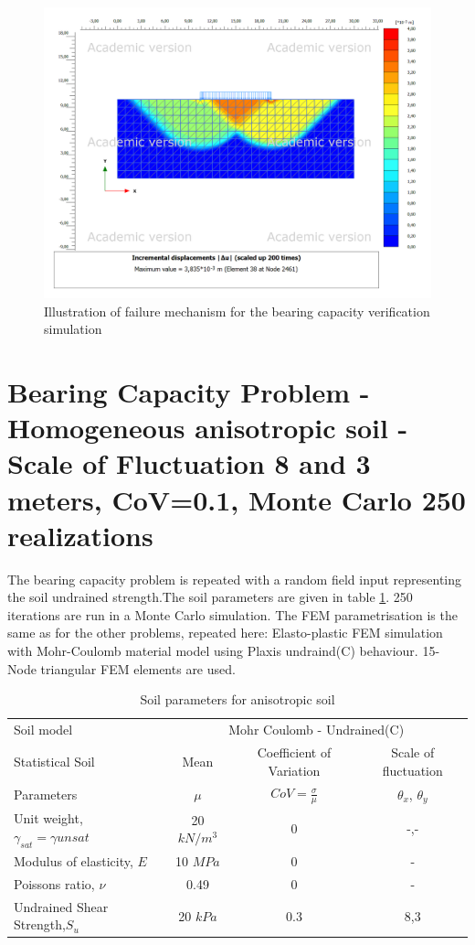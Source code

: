 \begin{figure}[h]
	\includegraphics[width=\textwidth]{fig/bc/testutot20211116-100146}
	\caption{Illustration of failure mechanism for the bearing capacity verification simulation}
	\label{fig:bc_su3}
\end{figure}

\section{Bearing Capacity Problem - Homogeneous anisotropic soil - Scale of Fluctuation 8 and 3 meters, CoV=0.1, Monte Carlo 250 realizations}
The bearing capacity problem is repeated with a random field input representing the soil undrained strength.The soil parameters are given in table \ref{tab:bc_su2}. 
250 iterations are run in a Monte Carlo simulation. The FEM parametrisation is the same as for the other problems, repeated here: 
Elasto-plastic FEM simulation with Mohr-Coulomb material model using Plaxis undraind(C) behaviour. 15-Node triangular FEM elements are used.
\begin{table}[h]
	\centering\small
	\caption{Soil parameters for anisotropic soil}
	\label{tab:bc_su2}
		\begin{tabular*}{\textwidth}{@{\extracolsep{\fill}}lccc}
			\toprule
			 Soil model  &\multicolumn{3}{c}{Mohr Coulomb - Undrained(C)}\\
  \cmidrule{2-4}
			Statistical Soil	& Mean		 	& Coefficient of Variation 		& Scale of fluctuation \\
			Parameters	  	& $\mu$ 		&  $CoV = \frac{\sigma}{\mu}$ 		& $\theta_x$, $\theta_y$ \\
        
			\midrule
			  Unit weight, $\gamma_{sat}=\gamma{unsat}$ & 20 $kN/m^3$ & 0 & -,- \\
		          Modulus of elasticity, $E$ & 10 $MPa$ & 0 & - \\
		          Poissons ratio, $\nu$ & 0.49 & 0 & - \\
		          Undrained Shear Strength,$S_u$ & 20 $kPa$ & 0.3 & 8,3 \\
			\bottomrule
		\end{tabular*}
\end{table}

